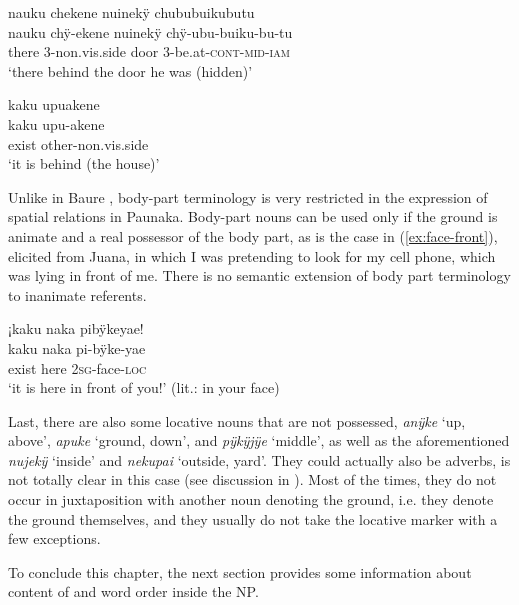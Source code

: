 {\ea\label{ex:loci-5}
\begingl
\glpreamble nauku chekene nuinekÿ chububuikubutu\\
\gla nauku chÿ-ekene nuinekÿ chÿ-ubu-buiku-bu-tu\\
\glb there 3-non.vis.side door 3-be.at-\textsc{cont}-\textsc{mid}-\textsc{iam}\\
\glft ‘there behind the door he was (hidden)’
\endgl
\trailingcitation{[jxx-n101013s-1.435]}
\xe

\ea\label{ex:loci-6}
\begingl
\glpreamble kaku upuakene \\
\gla kaku upu-akene \\
\glb exist other-non.vis.side\\
\glft ‘it is behind (the house)’
\endgl
\trailingcitation{[jxx-e191021e-2]}%
\xe


Unlike in Baure \citep[cf.][81--82]{Admiraal2016}, body-part terminology is very restricted in the expression of spatial relations in Paunaka. Body-part nouns can be used only if the ground is animate and a real possessor of the body part, as is the case in (\ref{ex:face-front}), elicited from Juana, in which I was pretending to look for my cell phone, which was lying in front of me. There is no semantic extension of body part terminology to inanimate referents.

\ea\label{ex:face-front}
\begingl
\glpreamble ¡kaku naka pibÿkeyae!\\
\gla kaku naka pi-bÿke-yae\\
\glb exist here 2\textsc{sg}-face-\textsc{loc}\\
\glft ‘it is here in front of you!’ (lit.: in your face)
\endgl
\trailingcitation{[jxx-p181104l-2]}%
\xe
{}

Last, there are also some locative nouns that are not possessed, \textit{anÿke} ‘up, above’, \textit{apuke} ‘ground, down’, and \textit{pÿkÿjÿe} ‘middle’, as well as the aforementioned \textit{nujekÿ} ‘inside’ and \textit{nekupai} ‘outside, yard’. They could actually also be adverbs,  is not totally clear in this case (see discussion in ). Most of the times, they do not occur in juxtaposition with another noun denoting the ground, i.e. they denote the ground themselves, and they usually do not take the locative marker with a few exceptions.

To conclude this chapter, the next section provides some information about content of and word order inside the NP.

}
